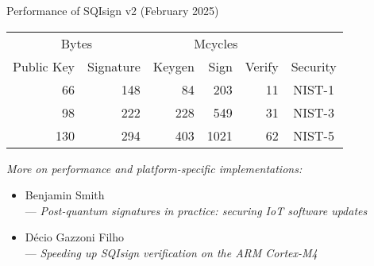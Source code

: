 \documentclass[aspectratio=169]{beamer}
\begin{document}
\begin{frame}{Performance of SQIsign v2 \small(February 2025)}
  \begin{table}[h]
    \centering
    \begin{tabular}{ r r | r r r | c }
      \multicolumn{2}{c|}{Bytes} & \multicolumn{3}{c|}{Mcycles}\\
      Public Key & Signature & Keygen & Sign & Verify & Security \\
      \hline
      66 & 148 & 84 & 203 & 11 & NIST-1 \\
      98 & 222 & 228 & 549 & 31 & NIST-3 \\
      130 & 294 & 403 & 1021 & 62 & NIST-5 \\
    \end{tabular}
  \end{table}

  \bigskip
  \emph{More on performance and platform-specific implementations:}
  \begin{itemize}
  \item Benjamin Smith\\
    --- \textit{Post-quantum signatures in practice: securing IoT software updates}
  \item Décio Gazzoni Filho\\
    --- \textit{Speeding up SQIsign verification on the ARM Cortex-M4}
  \end{itemize}
\end{frame}

\end{document}

